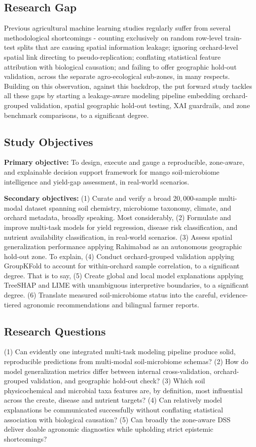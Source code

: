 \documentclass[runningheads,a4paper,oribibl]{llncs}
\begin{document}
\subsection{Research Gap}
Previous agricultural machine learning studies regularly suffer from several methodological shortcomings\cite{liakos2018} - counting exclusively on random row-level train-test splits that are causing spatial information leakage; ignoring orchard-level spatial link directing to pseudo-replication; conflating statistical feature attribution with biological causation; and failing to offer geographic hold-out validation, across the separate agro-ecological sub-zones, in many respects. Building on this observation, against this backdrop, the put forward study tackles all these gaps by starting a leakage-aware modeling pipeline embedding orchard-grouped validation, spatial geographic hold-out testing, XAI guardrails, and zone benchmark comparisons, to a significant degree.

\subsection{Study Objectives}
\textbf{Primary objective:} To design, execute and gauge a reproducible, zone-aware, and explainable decision support framework for mango soil-microbiome intelligence and yield-gap assessment, in real-world scenarios.

\textbf{Secondary objectives:}
(1) Curate and verify a broad $20{,}000$-sample multi-modal dataset spanning soil chemistry, microbiome taxonomy, climate, and orchard metadata, broadly speaking.
Most considerably, (2) Formulate and improve multi-task models for yield regression, disease risk classification, and nutrient availability classification, in real-world scenarios.
(3) Assess spatial generalization performance applying Rahimabad as an autonomous geographic hold-out zone.
To explain, (4) Conduct orchard-grouped validation applying GroupKFold to account for within-orchard sample correlation, to a significant degree.
That is to say, (5) Create global and local model explanations applying TreeSHAP and LIME with unambiguous interpretive boundaries, to a significant degree.
(6) Translate measured soil-microbiome status into the careful, evidence-tiered agronomic recommendations and bilingual farmer reports.

\subsection{Research Questions}
(1) Can evidently one integrated multi-task modeling pipeline produce solid, reproducible predictions from multi-modal soil-microbiome schemas?
(2) How do model generalization metrics differ between internal cross-validation, orchard-grouped validation, and geographic hold-out check?
(3) Which soil physicochemical and microbial taxa features are, by definition, most influential across the create, disease and nutrient targets?
(4) Can relatively model explanations be communicated successfully without conflating statistical association with biological causation?
(5) Can broadly the zone-aware DSS deliver doable agronomic diagnostics while upholding strict epistemic shortcomings?
\end{document}
